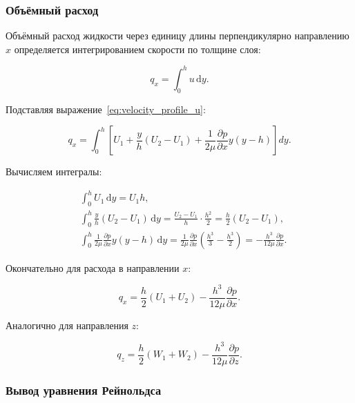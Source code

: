 \subsubsection*{Объёмный расход}

Объёмный расход жидкости через единицу длины перпендикулярно направлению $x$ определяется интегрированием скорости по толщине слоя:

\begin{equation}
q_x = \int_0^h u \,\mathrm{d}y.
\end{equation}

Подставляя выражение~\eqref{eq:velocity_profile_u}:

\begin{equation}
q_x = \int_0^h \left[U_1 + \frac{y}{h}(U_2 - U_1) + \frac{1}{2\mu}\frac{\partial p}{\partial x}y(y - h)\right] dy.
\end{equation}

Вычисляем интегралы:

\begin{equation}
\begin{aligned}
&\int_0^h U_1 \,\mathrm{d}y = U_1 h, \\
&\int_0^h \frac{y}{h}(U_2 - U_1) \,\mathrm{d}y = \frac{U_2 - U_1}{h} \cdot \frac{h^2}{2} = \frac{h}{2}(U_2 - U_1), \\
&\int_0^h \frac{1}{2\mu}\frac{\partial p}{\partial x}y(y - h) \,\mathrm{d}y = \frac{1}{2\mu}\frac{\partial p}{\partial x}\left(\frac{h^3}{3} - \frac{h^3}{2}\right) = -\frac{h^3}{12\mu}\frac{\partial p}{\partial x}.
\end{aligned}
\end{equation}

Окончательно для расхода в направлении $x$:

\begin{equation}
q_x = \frac{h}{2}(U_1 + U_2) - \frac{h^3}{12\mu}\frac{\partial p}{\partial x}.
\label{eq:flow_rate_x}
\end{equation}

Аналогично для направления $z$:

\begin{equation}
q_z = \frac{h}{2}(W_1 + W_2) - \frac{h^3}{12\mu}\frac{\partial p}{\partial z}.
\label{eq:flow_rate_z}
\end{equation}

\subsubsection*{Вывод уравнения Рейнольдса}

